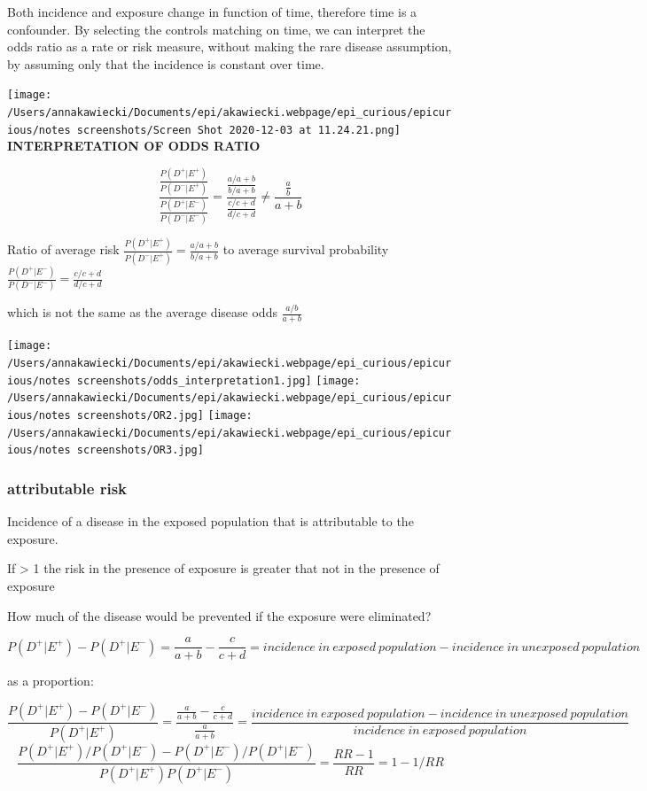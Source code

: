 \documentclass[
]{article}
\begin{document}
Both incidence and exposure change in function of time, therefore time
is a confounder. By selecting the controls matching on time, we can
interpret the odds ratio as a rate or risk measure, without making the
rare disease assumption, by assuming only that the incidence is constant
over time.

\texttt{[image: /Users/annakawiecki/Documents/epi/akawiecki.webpage/epi\_curious/epicurious/notes screenshots/Screen Shot 2020-12-03 at 11.24.21.png]}
\textbf{INTERPRETATION OF ODDS RATIO}

\[\frac{\frac{P(D^+|E^+)}{P(D^-|E^+)}}{\frac{P(D^+|E^-)}{P(D^-|E^-)}}= \frac{\frac{a/a+b}{b/a+b}}{\frac{c/c+d}{d/c+d}} \ne \frac{\frac{a}{b}}{a+b}\]

Ratio of average risk
\(\frac{P(D^+|E^+)}{P(D^-|E^+)}= \frac{a/a+b}{b/a+b}\) to average
survival probability
\(\frac{P(D^+|E^-)}{P(D^-|E^-)}= \frac{c/c+d}{d/c+d}\)

which is not the same as the average disease odds \(\frac{a/b}{a+b}\)

\texttt{[image: /Users/annakawiecki/Documents/epi/akawiecki.webpage/epi\_curious/epicurious/notes screenshots/odds\_interpretation1.jpg]}
\texttt{[image: /Users/annakawiecki/Documents/epi/akawiecki.webpage/epi\_curious/epicurious/notes screenshots/OR2.jpg]}
\texttt{[image: /Users/annakawiecki/Documents/epi/akawiecki.webpage/epi\_curious/epicurious/notes screenshots/OR3.jpg]}

\hypertarget{attributable-risk}{%
\subsubsection{attributable risk}\label{attributable-risk}}

Incidence of a disease in the exposed population that is attributable to
the exposure.

If \textgreater{} 1 the risk in the presence of exposure is greater that
not in the presence of exposure

How much of the disease would be prevented if the exposure were
eliminated?

\[{P(D^+|E^+)}-{P(D^+|E^-)}={\frac{a}{a+b}}-{\frac{c}{c+d}}={incidence\:in\:exposed\:population} -{incidence\:in\:unexposed\:population}\]

as a proportion:

\[\frac{{P(D^+|E^+)}-{P(D^+|E^-)}}{P(D^+|E^+)}=\frac{{\frac{a}{a+b}}-{\frac{c}{c+d}}}{\frac{a}{a+b}}=\frac{{incidence\:in\:exposed\:population} -{incidence\:in\:unexposed\:population}}{incidence\:in\:exposed\:population}\]
\[\frac{{P(D^+|E^+)}/{P(D^+|E^-)}-{P(D^+|E^-)}/{P(D^+|E^-)}}{P(D^+|E^+){P(D^+|E^-)}}= \frac{RR - 1}{RR}= 1- 1/RR\]
\end{document}
